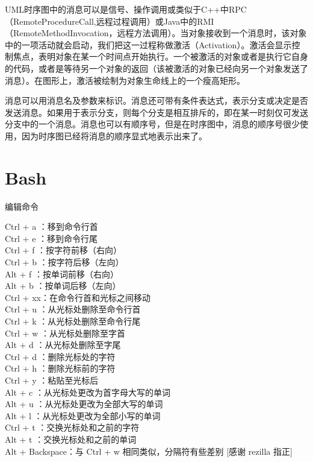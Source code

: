 \documentclass[a4paper,11pt]{book}
\begin{document}
UML时序图中的消息可以是信号、操作调用或类似于C++中RPC（RemoteProcedureCall,远程过程调用）或Java中的RMI（RemoteMethodInvocation，远程方法调用）。当对象接收到一个消息时，该对象中的一项活动就会启动，我们把这一过程称做激活（Activation）。激活会显示控制焦点，表明对象在某一个时间点开始执行。一个被激活的对象或者是执行它自身的代码，或者是等待另一个对象的返回（该被激活的对象已经向另一个对象发送了消息）。在图形上，激活被绘制为对象生命线上的一个瘦高矩形。

消息可以用消息名及参数来标识。消息还可带有条件表达式，表示分支或决定是否发送消息。如果用于表示分支，则每个分支是相互排斥的，即在某一时刻仅可发送分支中的一个消息。消息也可以有顺序号，但是在时序图中，消息的顺序号很少使用，因为时序图已经将消息的顺序显式地表示出来了。

\chapter{Bash}
编辑命令

    Ctrl + a ：移到命令行首\\
    Ctrl + e ：移到命令行尾\\
    Ctrl + f ：按字符前移（右向）\\
    Ctrl + b ：按字符后移（左向）\\
    Alt + f ：按单词前移（右向）\\
    Alt + b ：按单词后移（左向）\\
    Ctrl + xx：在命令行首和光标之间移动\\
    Ctrl + u ：从光标处删除至命令行首\\
    Ctrl + k ：从光标处删除至命令行尾\\
    Ctrl + w ：从光标处删除至字首\\
    Alt + d ：从光标处删除至字尾\\
    Ctrl + d ：删除光标处的字符\\
    Ctrl + h ：删除光标前的字符\\
    Ctrl + y ：粘贴至光标后\\
    Alt + c ：从光标处更改为首字母大写的单词\\
    Alt + u ：从光标处更改为全部大写的单词\\
    Alt + l ：从光标处更改为全部小写的单词\\
    Ctrl + t ：交换光标处和之前的字符\\
    Alt + t ：交换光标处和之前的单词\\
    Alt + Backspace：与 Ctrl + w 相同类似，分隔符有些差别 [感谢 rezilla 指正]\\
\end{document}
